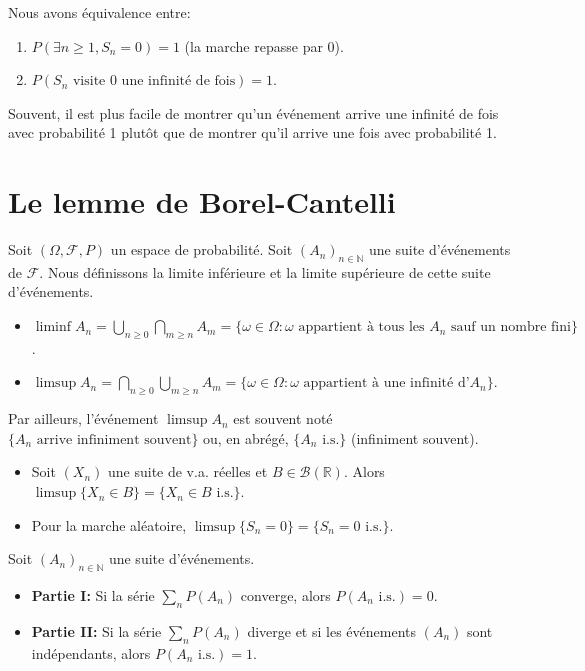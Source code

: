 \begin{theorem}[Équivalence]
Nous avons équivalence entre:
\begin{enumerate}
    \item $P(\exists n \ge 1, S_n=0) = 1$ (la marche repasse par 0).
    \item $P(S_n \text{ visite 0 une infinité de fois}) = 1$.
\end{enumerate}
\end{theorem}
\begin{remark}
Souvent, il est plus facile de montrer qu'un événement arrive une infinité de fois avec probabilité 1 plutôt que de montrer qu'il arrive une fois avec probabilité 1.
\end{remark}
\section{Le lemme de Borel-Cantelli}
Soit $(\Omega, \mathcal{F}, P)$ un espace de probabilité. Soit $(A_n)_{n \in \mathbb{N}}$ une suite d'événements de $\mathcal{F}$.
Nous définissons la limite inférieure et la limite supérieure de cette suite d'événements.
\begin{definition}
\begin{itemize}
    \item $\liminf A_n = \bigcup_{n \ge 0} \bigcap_{m \ge n} A_m = \{ \omega \in \Omega : \omega \text{ appartient à tous les } A_n \text{ sauf un nombre fini} \}$.
    \item $\limsup A_n = \bigcap_{n \ge 0} \bigcup_{m \ge n} A_m = \{ \omega \in \Omega : \omega \text{ appartient à une infinité d'} A_n \}$.
\end{itemize}
Par ailleurs, l'événement $\limsup A_n$ est souvent noté $\{A_n \text{ arrive infiniment souvent}\}$ ou, en abrégé, $\{A_n \text{ i.s.}\}$ (infiniment souvent).
\end{definition}
\begin{example}
\begin{itemize}
    \item Soit $(X_n)$ une suite de v.a. réelles et $B \in \mathcal{B}(\mathbb{R})$. Alors $\limsup \{X_n \in B\} = \{X_n \in B \text{ i.s.}\}$.
    \item Pour la marche aléatoire, $\limsup \{S_n=0\} = \{S_n=0 \text{ i.s.}\}$.
\end{itemize}
\end{example}
\begin{lemma}
Soit $(A_n)_{n \in \mathbb{N}}$ une suite d'événements.
\begin{itemize}
    \item \textbf{Partie I:} Si la série $\sum_n P(A_n)$ converge, alors $P(A_n \text{ i.s.}) = 0$.
    \item \textbf{Partie II:} Si la série $\sum_n P(A_n)$ diverge et si les événements $(A_n)$ sont indépendants, alors $P(A_n \text{ i.s.}) = 1$.
\end{itemize}
\end{lemma}
